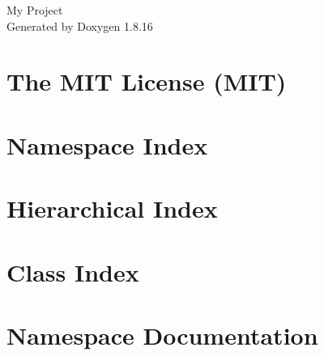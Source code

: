 \let\mypdfximage\pdfximage\def\pdfximage{\immediate\mypdfximage}\documentclass[twoside]{book}
\newcommand{\+}{\discretionary{\mbox{\scriptsize$\hookleftarrow$}}{}{}}
\newcommand{\clearemptydoublepage}{%
  \newpage{\pagestyle{empty}\cleardoublepage}%
}
\begin{document}
\hypersetup{pageanchor=false,
             bookmarksnumbered=true,
             pdfencoding=unicode
            }
\begin{titlepage}
\vspace*{7cm}
\begin{center}%
{\Large My Project }\\
\vspace*{1cm}
{\large Generated by Doxygen 1.8.16}\\
\end{center}
\end{titlepage}
\clearemptydoublepage
{}
\tableofcontents
\clearemptydoublepage
{}
\hypersetup{pageanchor=true}

\chapter{The M\+IT License (M\+IT)}
\label{md_wwwroot_lib_jquery-validation__l_i_c_e_n_s_e}

\chapter{Namespace Index}

\chapter{Hierarchical Index}

\chapter{Class Index}

\chapter{Namespace Documentation}











\end{document}
